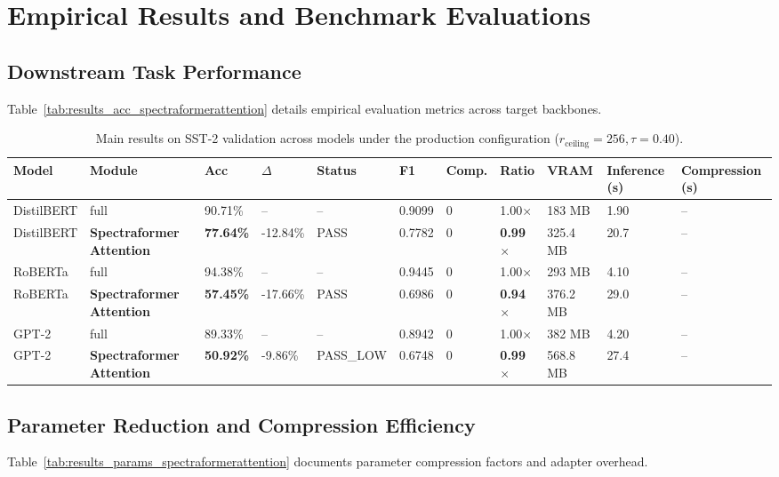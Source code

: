 \section{Empirical Results and Benchmark Evaluations}

\subsection{Downstream Task Performance}
Table~\ref{tab:results_acc_spectraformerattention} details empirical evaluation metrics across target backbones.

\begin{table}[t]
\centering
\small
\begin{tabular}{lllllllllll}
\toprule
\textbf{Model} & \textbf{Module} & \textbf{Acc} & \textbf{$\Delta$} & \textbf{Status} & \textbf{F1} & \textbf{Comp.} & \textbf{Ratio} & \textbf{VRAM} & \textbf{Inference (s)} & \textbf{Compression (s)} \\
\midrule
DistilBERT & full & 90.71\% & -- & -- & 0.9099 & 0 & 1.00$\times$ & 183 MB & 1.90 & -- \\
DistilBERT & \textbf{Spectraformer Attention} & \textbf{77.64\%} & -12.84\% & PASS & 0.7782 & 0 & \textbf{0.99$\times$} & 325.4 MB & 20.7 & -- \\
RoBERTa & full & 94.38\% & -- & -- & 0.9445 & 0 & 1.00$\times$ & 293 MB & 4.10 & -- \\
RoBERTa & \textbf{Spectraformer Attention} & \textbf{57.45\%} & -17.66\% & PASS & 0.6986 & 0 & \textbf{0.94$\times$} & 376.2 MB & 29.0 & -- \\
GPT-2 & full & 89.33\% & -- & -- & 0.8942 & 0 & 1.00$\times$ & 382 MB & 4.20 & -- \\
GPT-2 & \textbf{Spectraformer Attention} & \textbf{50.92\%} & -9.86\% & PASS\_LOW & 0.6748 & 0 & \textbf{0.99$\times$} & 568.8 MB & 27.4 & -- \\
\bottomrule
\end{tabular}
\caption{Main results on SST-2 validation across models under the production configuration ($r_{\mathrm{ceiling}}=256, \tau=0.40$).}
\label{tab:main_sst2}
\end{table}

\subsection{Parameter Reduction and Compression Efficiency}
Table~\ref{tab:results_params_spectraformerattention} documents parameter compression factors and adapter overhead.

